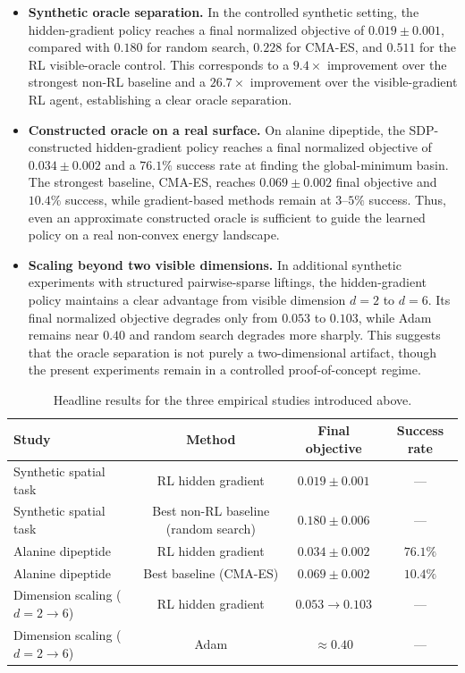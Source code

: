 \documentclass[10pt]{article}
\theoremstyle{definition}
\begin{document}
\begin{itemize}
    \item \textbf{Synthetic oracle separation.} In the controlled synthetic setting, the hidden-gradient policy reaches a final normalized objective of $0.019 \pm 0.001$, compared with $0.180$ for random search, $0.228$ for CMA-ES, and $0.511$ for the RL visible-oracle control. This corresponds to a $9.4\times$ improvement over the strongest non-RL baseline and a $26.7\times$ improvement over the visible-gradient RL agent, establishing a clear oracle separation.
    \item \textbf{Constructed oracle on a real surface.} On alanine dipeptide, the SDP-constructed hidden-gradient policy reaches a final normalized objective of $0.034 \pm 0.002$ and a $76.1\%$ success rate at finding the global-minimum basin. The strongest baseline, CMA-ES, reaches $0.069 \pm 0.002$ final objective and $10.4\%$ success, while gradient-based methods remain at $3$--$5\%$ success. Thus, even an approximate constructed oracle is sufficient to guide the learned policy on a real non-convex energy landscape.
    \item \textbf{Scaling beyond two visible dimensions.} In additional synthetic experiments with structured pairwise-sparse liftings, the hidden-gradient policy maintains a clear advantage from visible dimension $d=2$ to $d=6$. Its final normalized objective degrades only from $0.053$ to $0.103$, while Adam remains near $0.40$ and random search degrades more sharply. This suggests that the oracle separation is not purely a two-dimensional artifact, though the present experiments remain in a controlled proof-of-concept regime.
\end{itemize}

\begin{table}[t]
    \centering
    \caption{Headline results for the three empirical studies introduced above.}
    \label{tab:intro_headline_results}
    \small
    \begin{tabular}{lccc}
        \toprule
        \textbf{Study} & \textbf{Method} & \textbf{Final objective} & \textbf{Success rate} \\
        \midrule
        Synthetic spatial task & RL hidden gradient & $0.019 \pm 0.001$ & --- \\
        Synthetic spatial task & Best non-RL baseline (random search) & $0.180 \pm 0.006$ & --- \\
        \midrule
        Alanine dipeptide & RL hidden gradient & $0.034 \pm 0.002$ & $76.1\%$ \\
        Alanine dipeptide & Best baseline (CMA-ES) & $0.069 \pm 0.002$ & $10.4\%$ \\
        \midrule
        Dimension scaling ($d=2 \rightarrow 6$) & RL hidden gradient & $0.053 \rightarrow 0.103$ & --- \\
        Dimension scaling ($d=2 \rightarrow 6$) & Adam & $\approx 0.40$ & --- \\
        \bottomrule
    \end{tabular}
\end{table}
\end{document}
